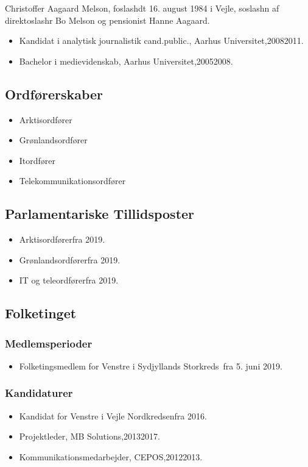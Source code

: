 \documentclass[11pt, a4paper]{awesome-cv}
\begin{document}
\makecvheader[R]
\makelettertitle
\begin{cvletter}
Christoffer Aagaard Melson, foslashdt 16. august 1984 i Vejle, soslashn af direktoslashr Bo Melson og pensionist Hanne Aagaard.

\begin{itemize}
\item Kandidat i analytisk journalistik cand.public., Aarhus Universitet,20082011.
\item Bachelor i medievidenskab, Aarhus Universitet,20052008.
\end{itemize}
\subsection*{Ordførerskaber}
\begin{itemize}
\item Arktisordfører
\item Grønlandsordfører
\item Itordfører
\item Telekommunikationsordfører
\end{itemize}
\subsection*{Parlamentariske Tillidsposter}
\begin{itemize}
\item Arktisordførerfra 2019.
\item Grønlandsordførerfra 2019.
\item IT og teleordførerfra 2019.
\end{itemize}
\subsection*{Folketinget}
\subsubsection*{Medlemsperioder}
\begin{itemize}
\item Folketingsmedlem for Venstre i Sydjyllands Storkreds fra 5. juni 2019.
\end{itemize}
\subsubsection*{Kandidaturer}
\begin{itemize}
\item Kandidat for Venstre i Vejle Nordkredsenfra 2016.
\end{itemize}
\begin{itemize}
\item Projektleder, MB Solutions,20132017.
\item Kommunikationsmedarbejder, CEPOS,20122013.
\end{itemize}
\end{cvletter}
\end{document}
